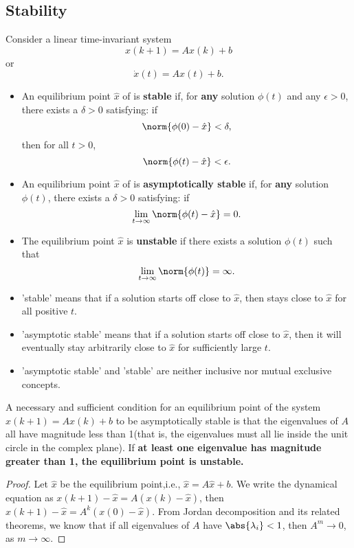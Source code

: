 \begin{refsection}
\subsection{Stability}
\begin{definition}
\cite[155]{luenberger1979introduction}
Consider a linear time-invariant system 
$$x(k+1) = Ax(k) + b$$ 
or 
$$\dot{x}(t) = Ax(t) + b.$$
\begin{itemize}
	\item An equilibrium point $\hat{x}$ of 
	is \textbf{stable} if, for \textbf{any} solution $\phi(t)$ and any $\epsilon > 0$, there exists a $\delta > 0$ satisfying: if 
	$$\norm{\phi(0) - \hat{x}} < \delta,$$
	then for all $t>0$,
	$$\norm{\phi(t) - \hat{x}} <\epsilon.$$
	\item An equilibrium point $\hat{x}$ of 
	is \textbf{asymptotically stable} if, for \textbf{any} solution $\phi(t)$, there exists a $\delta > 0$ satisfying: if 
	$$\lim_{t\to \infty}\norm{\phi(t) - \hat{x}} = 0.$$
	\item The equilibrium  point $\hat{x}$ is \textbf{unstable} if there exists a solution $\phi(t)$ such that
	$$\lim_{t\to \infty}\norm{\phi(t)} = \infty.$$ 
\end{itemize}
\end{definition}

\begin{remark}[interpretation]\hfill
\begin{itemize}
	\item 'stable' means that if a solution starts off close to $\hat{x}$, then stays close to $\hat{x}$ for all positive $t$.
	\item 'asymptotic stable' means that if a solution starts off close to $\hat{x}$, then it will eventually stay arbitrarily close to $\hat{x}$ for sufficiently large $t$.
	\item 'asymptotic stable' and 'stable' are neither inclusive nor mutual exclusive concepts. 
\end{itemize}	
\end{remark}





\begin{theorem}
\cite[156]{luenberger1979introduction}A necessary and sufficient condition for an equilibrium point of the system $x(k+1) = Ax(k) + b$ to be asymptotically stable is that the eigenvalues of $A$ all have magnitude less than 1(that is, the eigenvalues must all lie inside the unit circle in the complex plane). If \textbf{at least one eigenvalue has magnitude greater than 1, the equilibrium point is unstable.}
\end{theorem}
\begin{proof}
Let $\hat{x}$ be the equilibrium point,i.e., $\hat{x} = A\hat{x} + b$. We write the dynamical equation as $x(k+1)-\hat{x} = A(x(k) - \hat{x})$, then
$x(k+1)-\hat{x} = A^k(x(0) - \hat{x}).$ From Jordan decomposition and its related theorems, we know that if all eigenvalues of $A$ have $\abs{\lambda_i} < 1$, then $A^m \to 0$, as $m \to \infty$.	
\end{proof}




\end{refsection}
